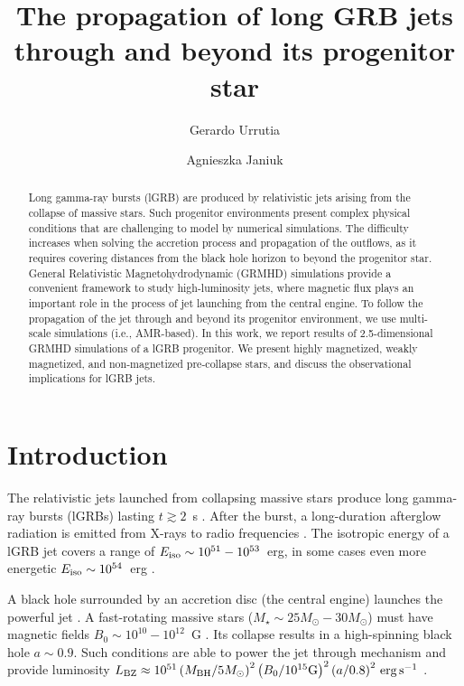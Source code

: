 \documentclass{ptapap}
\author{Gerardo Urrutia}[CFT]
\author{Agnieszka Janiuk}[CFT]
\affil[CFT]{Center for Theoretical Physics, Polish Academy of Sciences, Al. Lotnikow 32/46, 02-668 Warsaw, Poland}
\title{The propagation of long GRB jets through and beyond its progenitor star}
\begin{document}
\maketitle

\begin{abstract}

Long gamma-ray bursts (lGRB) are produced by relativistic jets arising from the collapse of massive stars. Such progenitor environments present complex physical conditions that are challenging to model by numerical simulations. The difficulty increases when solving the accretion process and propagation of the outflows, as it requires covering distances from the black hole horizon to beyond the progenitor star. General Relativistic Magnetohydrodynamic (GRMHD) simulations provide a convenient framework to study high-luminosity jets, where magnetic flux plays an important role in the process of jet launching from the central engine. To follow the propagation of the jet through and beyond its progenitor environment, we use multi-scale simulations (i.e., AMR-based). In this work, we report results of 2.5-dimensional GRMHD simulations of a lGRB progenitor. We present highly magnetized, weakly magnetized, and non-magnetized pre-collapse stars, and discuss the observational implications for lGRB jets.
  

\end{abstract}

\section{Introduction}

The relativistic jets launched from collapsing massive stars produce long gamma-ray bursts (lGRBs) lasting $t \gtrsim 2$~s \citep[e.g.,][]{kumar15}. After the burst, a long-duration afterglow radiation is emitted from X-rays to radio frequencies \citep{Frailetal1997,Ramirez-Ruiz-Mcfadyen_2010,perley14}. The isotropic energy of a lGRB jet covers a range of $E_{\rm iso}\sim 10^{51}-10^{53}$~erg, in some cases even more energetic $E_{\rm iso}\sim 10^{54}$~erg \citep{Atteia2017,Angulo2024}. 

A black hole surrounded by an accretion disc (the central engine) launches the powerful jet \citep{paczynski91}. A fast-rotating massive stars ($M_\star \sim 25 M_\odot - 30 M_\odot$) must have magnetic fields $B_0\sim 10^{10}-10^{12}$~G \citep[e.g.,][]{MacFadyenWoosley1999,Burrows_2007}. Its collapse results in a high-spinning black hole $a\sim 0.9$. Such conditions are able to power the jet through \citet{bz77} mechanism and provide luminosity $L_{\rm BZ} \approx 10^{51}\left( M_{\rm BH}/5M_\odot \right)^2 \left( B_0 / 10^{15}{\rm G} \right)^2 \left( a/0.8 \right)^2\, {\rm erg}\,{\rm s}^{-1}$   \citep{MacFadyenWoosley1999,WoosleyBloom2006,KomissarovBarkov2009,BrombergTchekhovskoy2016,bugli2021,gottlieb2022a,Burrows2023,Vartanyan2025,Burrows2025,Morales-Rivera2025}.
\end{document}
